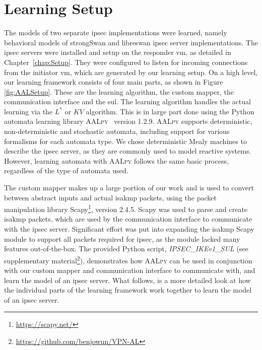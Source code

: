 \section{Learning Setup} \label{subsec:learningenv}%
The models of two separate \ac{ipsec} implementations were learned, namely behavioral models of strongSwan and libreswan \ac{ipsec} server implementations. The \ac{ipsec} servers were installed and setup on the responder \ac{vm}, as detailed in Chapter~\ref{chap:Setup}. They were configured to listen for incoming connections from the initiator \ac{vm}, which are generated by our learning setup. On a high level, our learning framework consists of four main parts, as shown in Figure \ref{fig:AALSetup}. These are the learning algorithm, the custom mapper, the communication interface and the \ac{sul}. The learning algorithm handles the actual learning via the $L^*$ or $KV$ algorithm. This is in large part done using the Python automata learning library \textsc{AALpy}~\cite{software:aalpy} version 1.2.9. \textsc{AALpy} supports deterministic, non-deterministic and stochastic automata, including support for various formalisms for each automata type. We chose deterministic Mealy machines to describe the \ac{ipsec} server, as they are commonly used to model reactive systems. However, learning automata with \textsc{AALpy} follows the same basic process, regardless of the type of automata used.

The custom mapper makes up a large portion of our work and is used to convert between abstract inputs and actual \ac{isakmp} packets, using the packet manipulation library Scapy\footnote{\url{https://scapy.net/}}, version 2.4.5. Scapy was used to parse and create \ac{isakmp} packets, which are used by the communication interface to communicate with the \ac{ipsec} server. Significant effort was put into expanding the \ac{isakmp} Scapy module to support all packets required for \ac{ipsec}, as the module lacked many features out-of-the-box. The provided Python script, \emph{IPSEC\_IKEv1\_SUL} (see supplementary material\footnote{\url{https://github.com/benjowun/VPN-AL}}), demonstrates how \textsc{AALpy} can be used in conjunction with our custom mapper and communication interface to communicate with, and learn the model of an \ac{ipsec} server. What follows, is a more detailed look at how the individual parts of the learning framework work together to learn the model of an \ac{ipsec} server.

